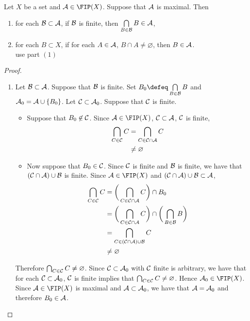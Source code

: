 \documentclass{book}
\begin{document}
	\begin{ex} 
		Let $X$ be a set and $\MA \in \FIP(X)$. Suppose that $\mathcal{A}$ is maximal. Then 
		\begin{enumerate}
			\item for each $\mathcal{B} \subset \mathcal{A}$, if $\mathcal{B}$ is finite, then $\bigcap\limits_{B \in \mathcal{B}} B \in \mathcal{A}$,
			\item for each $B \subset X$, if for each $A \in \mathcal{A}$, $B \cap A \neq \varnothing$, then $B \in \mathcal{A}$. \\
			 use part $(1)$
		\end{enumerate}
	\end{ex}

	\begin{proof}\
		\begin{enumerate}
			\item Let $\mathcal{B} \subset \mathcal{A}$. Suppose that $\mathcal{B}$ is finite. Set $B_0 \defeq \bigcap\limits_{B \in \MB} B$ and $\mathcal{A}_0 = \mathcal{A} \cup \{B_0\}$. Let $\mathcal{C} \subset \mathcal{A}_0$. Suppose that $\mathcal{C}$ is finite. 
			\begin{itemize}
				\item Suppose that $B_0 \not \in \mathcal{C}$. Since $\MA \in \FIP(X)$, $\mathcal{C} \subset \mathcal{A}$, $\mathcal{C}$ is finite,  
				\begin{align*}
					\bigcap_{C \in \mathcal{C}} C 
					& = \bigcap_{C \in \mathcal{C} \cap \mathcal{A}} C \\
					& \neq \varnothing
				\end{align*} 
				\item Now suppose that $B_0 \in \mathcal{C}$. Since $\mathcal{C}$ is finite and $\mathcal{B}$ is finite, we have that $(\mathcal{C} \cap \mathcal{A}) \cup \mathcal{B}$ is finite. Since $\MA \in \FIP(X)$ and $(\mathcal{C} \cap \mathcal{A}) \cup \mathcal{B} \subset \mathcal{A}$,  
				\begin{align*}
					\bigcap_{C \in \mathcal{C}} C 
					& = \bigg( \bigcap_{C \in \mathcal{C} \cap \mathcal{A}} C \bigg) \cap B_0  \\
					& = \bigg( \bigcap_{C \in \mathcal{C} \cap \mathcal{A}} C \bigg) \cap \bigg( \bigcap\limits_{B \in \mathcal{B}} B \bigg)  \\
					& = \bigcap_{C \in (\mathcal{C} \cap \mathcal{A}) \cup \mathcal{B}} C \\
					& \neq \varnothing
				\end{align*} 
			\end{itemize}
			Therefore $\bigcap_{C \in \mathcal{C}} C \neq \varnothing$. Since $\mathcal{C} \subset \mathcal{A}_0$ with $\mathcal{C}$ finite is arbitrary, we have that for each $\mathcal{C} \subset \mathcal{A}_0$, $\mathcal{C}$ is finite implies that $\bigcap_{C \in \mathcal{C}} C \neq \varnothing$. Hence $\MA_0 \in \FIP(X)$. Since $\MA \in \FIP(X)$ is maximal and $\mathcal{A} \subset \mathcal{A}_0$, we have that $\mathcal{A} = \mathcal{A}_0$ and therefore $B_0 \in \mathcal{A}$. 

\end{enumerate}
\end{proof}
\end{document}
